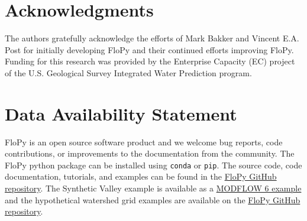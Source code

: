 \documentclass[11pt, oneside]{article}  	%
\begin{document}
\section*{Acknowledgments}
The authors gratefully acknowledge the efforts of Mark Bakker and Vincent E.A. Post for initially developing FloPy and their continued efforts improving FloPy. Funding for this research was provided by the Enterprise Capacity (EC) project of the U.S. Geological Survey Integrated Water Prediction program.

\section*{Data Availability Statement}
FloPy is an open source software product and we welcome bug reports, code contributions, or improvements to the documentation from the community. The FloPy python package can be installed using \texttt{conda} or \texttt{pip}. The source code, code documentation, tutorials, and examples can be found in the \href{https://github.com/modflowpy/flopy}{FloPy GitHub repository}. The Synthetic Valley example is available as a \href{https://modflow6-examples.readthedocs.io/en/master/examples.html}{MODFLOW 6 example} and the hypothetical watershed grid examples are available on the \href{https://github.com/modflowpy/flopy/tree/develop/examples/mf6_groundwater_paper}{FloPy GitHub repository}.




\end{document}
